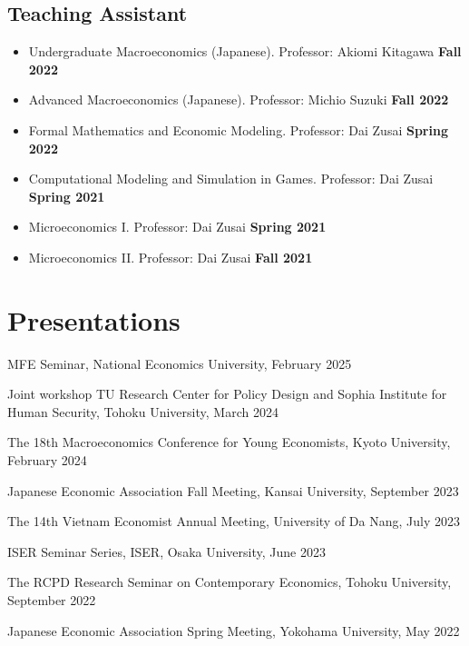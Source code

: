 \documentclass[12pt]{article}
\begin{document}
\subsection{Teaching Assistant}
\begin{itemize}
	\item[ ] Undergraduate Macroeconomics (Japanese). Professor: Akiomi Kitagawa \hfill {\bf Fall 2022}
 	\item[ ] Advanced Macroeconomics (Japanese). Professor: Michio Suzuki \hfill {\bf Fall 2022}
  	\item[ ] Formal Mathematics and Economic Modeling. Professor: Dai Zusai \hfill {\bf Spring 2022}
   	\item[ ] Computational Modeling and Simulation in Games. Professor: Dai Zusai \hfill {\bf Spring 2021}
    	\item[ ] Microeconomics I. Professor: Dai Zusai \hfill {\bf Spring 2021}
     	\item[ ] Microeconomics II. Professor: Dai Zusai \hfill {\bf Fall 2021}
\end{itemize}


\section{Presentations}

\begin{enumerate}[label={[\arabic*]}]
\item MFE Seminar, National Economics University, February 2025
\item Joint workshop TU Research Center for Policy Design and Sophia Institute for Human Security, Tohoku University, March 2024
\item The 18th Macroeconomics Conference for Young Economists, Kyoto University, February 2024
\item Japanese Economic Association Fall Meeting, Kansai University, September 2023
\item The 14th Vietnam Economist Annual Meeting, University of Da Nang, July 2023
\item ISER Seminar Series, ISER, Osaka University, June 2023
\item The RCPD Research Seminar on Contemporary Economics, Tohoku University, September 2022
\item Japanese Economic Association Spring Meeting, Yokohama University, May 2022
\end{enumerate}
\end{document}
